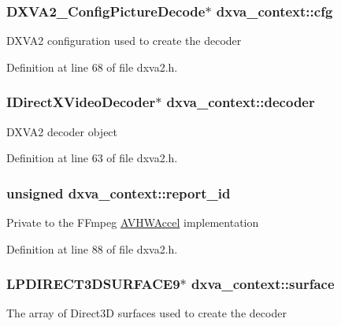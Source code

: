 \subsubsection[{\texorpdfstring{cfg}{cfg}}]{ D\+X\+V\+A2\+\_\+\+Config\+Picture\+Decode$\ast$ dxva\+\_\+context\+::cfg}\hypertarget{structdxva__context_aa384da68277dd76f744c4ed23d27c4be}{}\label{structdxva__context_aa384da68277dd76f744c4ed23d27c4be}
D\+X\+V\+A2 configuration used to create the decoder 

Definition at line 68 of file dxva2.\+h.

\subsubsection[{\texorpdfstring{decoder}{decoder}}]{\setlength{\rightskip}{0pt plus 5cm}I\+Direct\+X\+Video\+Decoder$\ast$ dxva\+\_\+context\+::decoder}\hypertarget{structdxva__context_a1029d27444d680f4a35ff5645231121a}{}\label{structdxva__context_a1029d27444d680f4a35ff5645231121a}
D\+X\+V\+A2 decoder object 

Definition at line 63 of file dxva2.\+h.

\subsubsection[{\texorpdfstring{report\+\_\+id}{report_id}}]{\setlength{\rightskip}{0pt plus 5cm}unsigned dxva\+\_\+context\+::report\+\_\+id}\hypertarget{structdxva__context_ab523653754a6a6eba2fa2782fa6ca8f2}{}\label{structdxva__context_ab523653754a6a6eba2fa2782fa6ca8f2}
Private to the F\+Fmpeg \hyperlink{struct_a_v_h_w_accel}{A\+V\+H\+W\+Accel} implementation 

Definition at line 88 of file dxva2.\+h.

\subsubsection[{\texorpdfstring{surface}{surface}}]{\setlength{\rightskip}{0pt plus 5cm}L\+P\+D\+I\+R\+E\+C\+T3\+D\+S\+U\+R\+F\+A\+C\+E9$\ast$ dxva\+\_\+context\+::surface}\hypertarget{structdxva__context_a68afa12df83019834d8ff22a08788054}{}\label{structdxva__context_a68afa12df83019834d8ff22a08788054}
The array of Direct3D surfaces used to create the decoder 

